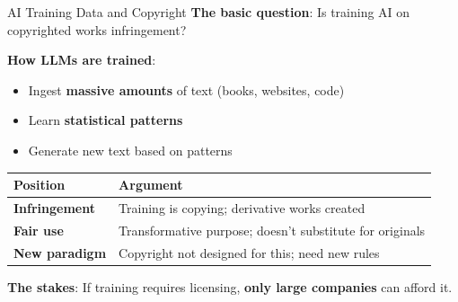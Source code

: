 ﻿\documentclass[aspectratio=169,11pt]{beamer}
\begin{document}
\begin{frame}{AI Training Data and Copyright}
\textbf{The basic question}: Is training AI on copyrighted works infringement?

\vspace{0.2cm}
\textbf{How LLMs are trained}:
\begin{itemize}
    \item Ingest \textbf{massive amounts} of text (books, websites, code)
    \item Learn \textbf{statistical patterns}
    \item Generate new text based on patterns
\end{itemize}

\vspace{0.3cm}
\begin{table}[h]
\centering
\small
\begin{tabular}{>{\bfseries}l p{6.5cm}}
\toprule
Position & Argument \\
\midrule
Infringement & Training is copying; derivative works created \\
Fair use & Transformative purpose; doesn't substitute for originals \\
New paradigm & Copyright not designed for this; need new rules \\
\bottomrule
\end{tabular}
\end{table}

\vspace{0.2cm}
\textbf{The stakes}: If training requires licensing, \textbf{only large companies} can afford it.
\end{frame}
\end{document}
